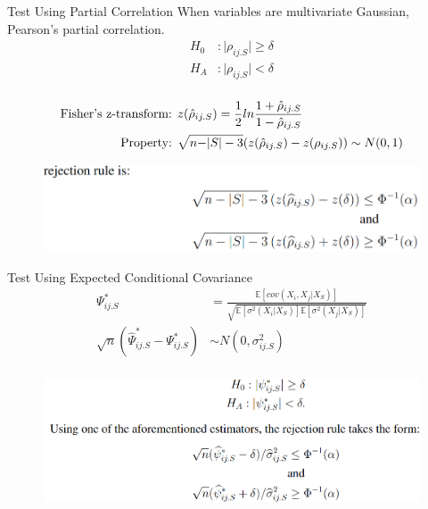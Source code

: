\documentclass{beamer}
\begin{document}
\begin{frame}{Test Using Partial Correlation}
	\center When variables are multivariate Gaussian, Pearson's partial correlation.
	\vspace{1em}
	\begin{equation*}
		\begin{split}
			H_0&: \rvert \rho_{ij.S} \rvert \ge \delta \\
			H_A&: \rvert \rho_{ij.S} \rvert < \delta \\
		\end{split}
	\end{equation*}

	\begin{equation*}
		\begin{split}
			\textnormal{Fisher's z-transform: }& z(\hat{\rho}_{ij.S}) = \frac{1}{2} ln \frac{1+\hat{\rho}_{ij.S}}{1 - \hat{\rho}_{ij.S}} \\
			\textnormal{Property: }& \sqrt{n - \rvert S \rvert - 3}(z(\hat{\rho}_{ij.S}) - z(\rho_{ij.S})) \sim N(0, 1) \\
		\end{split}
	\end{equation*}
	\begin{figure}
		\centering
		\includegraphics[scale=0.35]{imgs/partial.png}
	\end{figure}
\end{frame}

\begin{frame}{Test Using Expected Conditional Covariance}
	\vspace{1em}
	\begin{equation*}
		\begin{split}
			\Psi^*_{ij.S} &= \frac{\mathbb{E}[cov(X_i, X_j | X_S)]}{\sqrt{\mathbb{E}[\sigma^2(X_i \rvert X_S)] \mathbb{E}[\sigma^2(X_j \rvert X_S)]}} \\
			\sqrt{n}(\hat{\Psi}^*_{ij.S} - \Psi^*_{ij.S}) & \sim N(0, \sigma^2_{ij.S}) \\
		\end{split}
	\end{equation*}
	\begin{figure}
		\centering
		\includegraphics[scale=0.35]{imgs/test2.png}
	\end{figure}
\end{frame}
\end{document}
